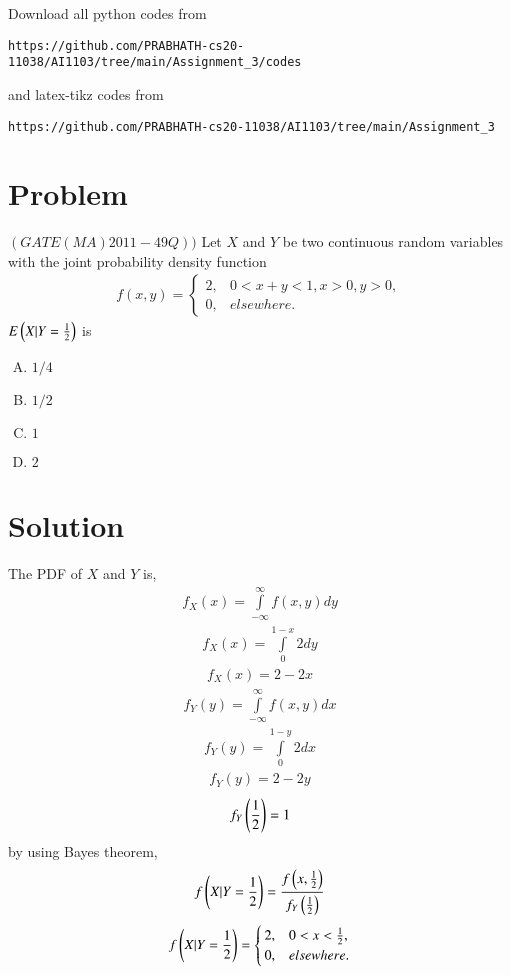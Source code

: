\documentclass[journal,12pt,twocolumn]{IEEEtran}
\begin{document}
Download all python codes from 
\begin{lstlisting}
https://github.com/PRABHATH-cs20-11038/AI1103/tree/main/Assignment_3/codes
\end{lstlisting}

and latex-tikz codes from
\begin{lstlisting}
https://github.com/PRABHATH-cs20-11038/AI1103/tree/main/Assignment_3
\end{lstlisting}

\section{Problem}

$(GATE(MA) 2011-49Q))$ Let $X$ and $Y$ be two continuous random variables with the joint probability density function
\begin{align}
    f(x,y) =
    \begin{cases}
    2, & 0<x+y<1, x>0, y>0,\\
    0, & elsewhere.
    \end{cases}
\end{align}
$E\left(X | Y=\frac{1}{2}\right)$ is
\begin{enumerate}[(A)]
    \item $1/4$
    \item $1/2$
    \item $1$
    \item $2$
\end{enumerate}
\section{Solution}

The PDF of $X$ and $Y$ is,
\begin{align}
    f_X(x)=\int\limits_{-\infty}^\infty f(x,y)d y
\end{align}
\begin{align}
    f_X(x)=\int\limits_0^{1-x}2d y
\end{align}
\begin{align}
    f_X(x)=2-2x
\end{align}
\begin{align}
    f_Y(y)=\int\limits_{-\infty}^\infty f(x,y)d x
\end{align}
\begin{align}
    f_Y(y)=\int\limits_0^{1-y}2d x
\end{align}
\begin{align}
    f_Y(y)=2-2y
\end{align}
\begin{align}
    f_Y\left(\frac{1}{2}\right)=1
\end{align}
by using Bayes theorem,
\begin{align}
    f\left(X | Y=\frac{1}{2}\right)=\frac{f\left(x,\frac{1}{2}\right)}{f_Y\left(\frac{1}{2}\right)}
\end{align}
\begin{align}
    f\left(X|Y=\frac{1}{2}\right)=
    \begin{cases}
    2, & 0<x<\frac{1}{2},\\
    0, & elsewhere.
    \end{cases}
\end{align}
\end{document}
